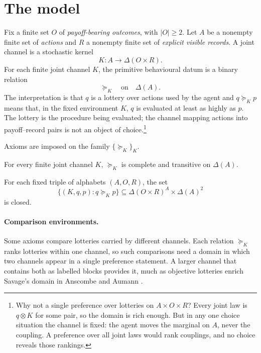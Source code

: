 \documentclass[11pt,a4paper]{article}
\theoremstyle{definition}
\newcommand{\D}{\Delta}
\newcommand{\1}{\mathbf 1}
\begin{document}
\section{The model}\label{sec:model}

Fix a finite set $O$ of \emph{payoff-bearing outcomes}, with $|O|\ge2$.  Let $A$ be a nonempty finite set of
\emph{actions} and $R$ a nonempty finite set of \emph{explicit visible records}.  A joint channel is a stochastic
kernel
\[
  K:A\longrightarrow\D(O\times R).
\]
For each finite joint channel $K$, the primitive behavioural datum is a binary relation
\[
 \succeq_K\quad\text{on}\quad\D(A).
\]
The interpretation is that $q$ is a lottery over actions used by the agent and $q\succeq_Kp$ means that, in the fixed
environment $K$, $q$ is evaluated at least as highly as $p$.  The lottery is the procedure being evaluated; the
channel mapping actions into payoff--record pairs is not an object of choice.\footnote{Why not a single
preference over lotteries on $A\times O\times R$?  Every joint law is $q\otimes K$ for some pair, so the domain
is rich enough.  But in any one choice situation the channel is fixed: the agent moves the marginal on $A$,
never the coupling.  A preference over all joint laws would rank couplings, and no choice reveals those
rankings.}

\bigskip
Axioms are imposed on the family $\{\succeq_K\}_K$.

\begin{description}[leftmargin=*,style=sameline]

\item[(A1) Weak order.]
\label{ax:weak-order}
For every finite joint channel $K$, $\succeq_K$ is complete and transitive on $\D(A)$.

\item[(A2) Continuity.]
\label{ax:continuity}
For each fixed triple of alphabets $(A,O,R)$, the set
\[
 \{(K,q,p):q\succeq_Kp\}
 \subseteq \D(O\times R)^A\times\D(A)^2
\]
is closed.

\end{description}

\paragraph{Comparison environments.}
Some axioms compare lotteries carried by different channels.  Each relation $\succeq_K$ ranks lotteries within
one channel, so such comparisons need a domain in which two channels appear in a single preference statement.  A
larger channel that contains both as labelled blocks provides it, much as objective lotteries enrich Savage's
domain in Anscombe and Aumann \cite{AnscombeAumann1963}.
\end{document}

